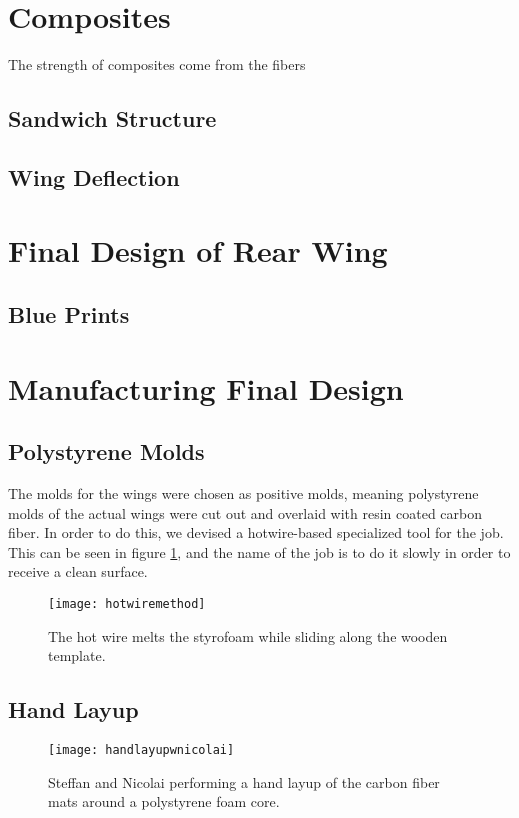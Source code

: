\section{Composites}

  The strength of composites come from the fibers

  \subsection{Sandwich Structure}
  \subsection{Wing Deflection}

\section{Final Design of Rear Wing}

  \subsection{Blue Prints}

\section{Manufacturing Final Design}
  \subsection{Polystyrene Molds}

  The molds for the wings were chosen as positive molds, meaning polystyrene molds of the actual wings were cut out and overlaid with resin coated carbon fiber. In order to do this, we devised a hotwire-based specialized tool for the job. This can be seen in figure \ref{fig:hotwire}, and the name of the job is to do it slowly in order to receive a clean surface.

  \begin{figure}
    \texttt{[image: hotwiremethod]}
    \caption{The hot wire melts the styrofoam while sliding along the wooden template.}
    \label{fig:hotwire}
  \end{figure}

  \subsection{Hand Layup}
    \begin{figure}
      \texttt{[image: handlayupwnicolai]}
      \caption{Steffan and Nicolai performing a hand layup of the carbon fiber mats around a polystyrene foam core.}
      \label{fig:handlayup}
    \end{figure}

